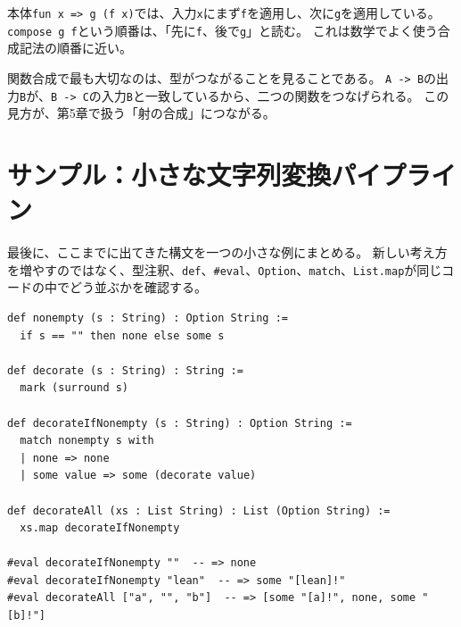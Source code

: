 本体\texttt{fun x => g (f x)}では、入力\texttt{x}にまず\texttt{f}を適用し、次に\texttt{g}を適用している。
\texttt{compose g f}という順番は、「先に\texttt{f}、後で\texttt{g}」と読む。
これは数学でよく使う合成記法の順番に近い。

\begin{intuitionbox}
関数合成で最も大切なのは、型がつながることを見ることである。
\texttt{A -> B}の出力\texttt{B}が、\texttt{B -> C}の入力\texttt{B}と一致しているから、二つの関数をつなげられる。
この見方が、第5章で扱う「射の合成」につながる。
\end{intuitionbox}


\section{サンプル：小さな文字列変換パイプライン}

最後に、ここまでに出てきた構文を一つの小さな例にまとめる。
新しい考え方を増やすのではなく、型注釈、\texttt{def}、\texttt{\#eval}、\texttt{Option}、\texttt{match}、\texttt{List.map}が同じコードの中でどう並ぶかを確認する。

\begin{listing}[htbp]
\begin{verbatim}
def nonempty (s : String) : Option String :=
  if s == "" then none else some s

def decorate (s : String) : String :=
  mark (surround s)

def decorateIfNonempty (s : String) : Option String :=
  match nonempty s with
  | none => none
  | some value => some (decorate value)

def decorateAll (xs : List String) : List (Option String) :=
  xs.map decorateIfNonempty

#eval decorateIfNonempty ""  -- => none
#eval decorateIfNonempty "lean"  -- => some "[lean]!"
#eval decorateAll ["a", "", "b"]  -- => [some "[a]!", none, some "[b]!"]
\end{verbatim}
\caption{文字列変換パイプライン}
\label{lst:ch01-string-pipeline}
\end{listing}

